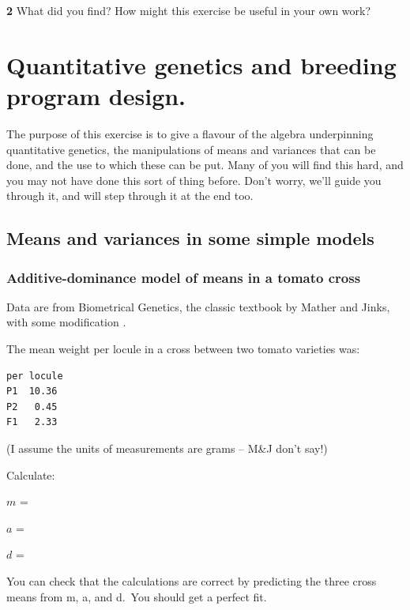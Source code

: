 \documentclass[
]{book}
\makeatletter
\newenvironment{kframe}{%
\medskip{}
\setlength{\fboxsep}{.8em}
 \def\at@end@of@kframe{}%
 \ifinner\ifhmode%
  \def\at@end@of@kframe{\end{minipage}}%
  \begin{minipage}{\columnwidth}%
 \fi\fi%
 \def\FrameCommand##1{\hskip\@totalleftmargin \hskip-\fboxsep
 \colorbox{shadecolor}{##1}\hskip-\fboxsep
     \hskip-\linewidth \hskip-\@totalleftmargin \hskip\columnwidth}%
 \MakeFramed {\advance\hsize-\width
   \@totalleftmargin\z@ \linewidth\hsize
   \@setminipage}}%
 {\par\unskip\endMakeFramed%
 \at@end@of@kframe}
\newenvironment{rmdblock}[1]
  {
  \begin{itemize}
  \renewcommand{\labelitemi}{
    \raisebox{-.7\height}[0pt][0pt]{
      {\setkeys{Gin}{width=3em,keepaspectratio}\texttt{[image: images/\#1]}}
    }
  }
  \setlength{\fboxsep}{1em}
  \begin{kframe}
  \item
  }
  {
  \end{kframe}
  \end{itemize}
  }
\newenvironment{rmdquiz}
  {\begin{rmdblock}{quiz}}
  {\end{rmdblock}}
\makeatother
\begin{document}
\begin{rmdquiz}
\textbf{2}
What did you find? How might this exercise be useful in your own work?
\end{rmdquiz}

\hypertarget{Quantitative-genetics}{%
\chapter{Quantitative genetics and breeding program design.}\label{Quantitative-genetics}}

The purpose of this exercise is to give a flavour of the algebra underpinning quantitative genetics, the manipulations of means and variances that can be done, and the use to which these can be put. Many of you will find this hard, and you may not have done this sort of thing before. Don't worry, we'll guide you through it, and will step through it at the end too.

\hypertarget{means-and-variances-in-some-simple-models}{%
\section{Means and variances in some simple models}\label{means-and-variances-in-some-simple-models}}

\hypertarget{additive-dominance-model-of-means-in-a-tomato-cross}{%
\subsection{Additive-dominance model of means in a tomato cross}\label{additive-dominance-model-of-means-in-a-tomato-cross}}

Data are from Biometrical Genetics, the classic textbook by Mather and Jinks, with some modification \citep{mather_biometrical_1971}.

The mean weight per locule in a cross between two tomato varieties was:

\begin{verbatim}
per locule
P1  10.36
P2   0.45
F1   2.33
\end{verbatim}

(I assume the units of measurements are grams -- M\&J don't say!)

Calculate:

\(m\) =

\(a\) =

\(d\) =

You can check that the calculations are correct by predicting the three cross means from m, a, and d.~You should get a perfect fit.
\end{document}
